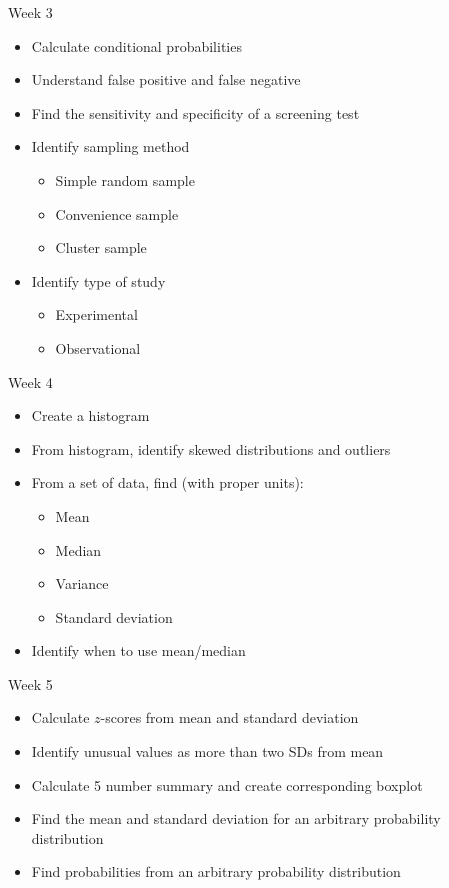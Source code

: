 \documentclass[xcolor=table, aspectratio=169, bigger]{beamer}
\begin{document}
\begin{frame}{Week 3}
\begin{block}{}
\begin{itemize}
\item Calculate conditional probabilities
\item Understand false positive and false negative
\item Find the sensitivity and specificity of a screening test
\item Identify sampling method
\begin{itemize}
\item Simple random sample
\item Convenience sample
\item Cluster sample
\end{itemize}
\item Identify type of study
\begin{itemize}
\item Experimental
\item Observational
\end{itemize}
\end{itemize}
\end{block}
\end{frame}



\begin{frame}{Week 4}
\begin{block}{}
\begin{itemize}
\item Create a histogram
\item From histogram, identify skewed distributions and outliers
\item From a set of data, find (with proper units):
\begin{itemize}
\item Mean
\item Median
\item Variance
\item Standard deviation
\end{itemize}
\item Identify when to use mean/median
\end{itemize}
\end{block}
\end{frame}


\begin{frame}{Week 5}
\begin{block}{}
\begin{itemize}
\item Calculate $z$-scores from mean and standard deviation
\item Identify unusual values as more than two SDs from mean
\item Calculate 5 number summary and create corresponding boxplot
\item Find the mean and standard deviation for an arbitrary probability distribution
\item Find probabilities from an arbitrary probability distribution
\end{itemize}
\end{block}
\end{frame}
\end{document}
